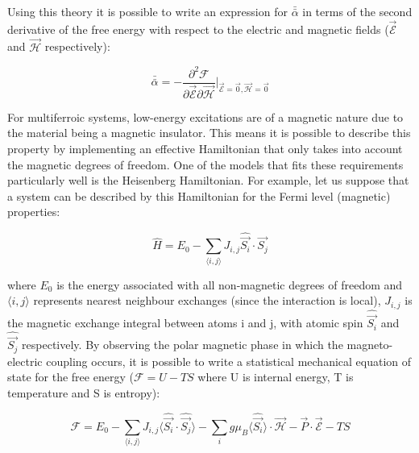 \documentclass[10pt]{article}
\begin{document}
Using this theory it is possible to write an expression for $\bar{\bar{\alpha}}$ in terms of the second derivative of the free energy with respect to the electric and magnetic fields ($\vec{\mathcal{E}}$ and $\vec{\mathcal{H}}$ respectively):

\begin{equation*}
\bar{\bar{\alpha}} = -\frac{\partial^2 \mathcal{F}}{\partial \vec{\mathcal{E}}\partial\vec{\mathcal{H}}}\biggr\vert_{\vec{\mathcal{E}}=\vec{0}, \vec{\mathcal{H}} = \vec{0}}
\end{equation*}

For multiferroic systems, low-energy excitations are of a magnetic nature due to the material being a magnetic insulator. This means it is possible to describe this property by implementing an effective Hamiltonian that only takes into account the magnetic degrees of freedom. One of the models that fits these requirements particularly well is the Heisenberg Hamiltonian. For example, let us suppose that a system can be described by this Hamiltonian for the Fermi level (magnetic) properties:

\begin{equation}
\hat{H} = E_0 - \sum_{\langle i,j \rangle} J_{i,j}\hat{\vec{S_i}}\cdot \hat{\vec{S_j}}
\end{equation}

where $E_0$ is the energy associated with all non-magnetic degrees of freedom and $\langle i,j \rangle$ represents nearest neighbour exchanges (since the interaction is local), $J_{i,j}$ is the magnetic exchange integral between atoms i and j, with atomic spin $\hat{\vec{S_i}}$ and $\hat{\vec{S_j}}$ respectively. By observing the polar magnetic phase in which the magneto-electric coupling occurs, it is possible to write a statistical mechanical equation of state for the free energy ($\mathcal{F} = U - TS$ where U is internal energy, T is temperature and S is entropy):

\begin{equation*}
\mathcal{F} = E_0 - \sum_{\langle i,j \rangle} J_{i,j}\langle \hat{\vec{S_i}}\cdot \hat{\vec{S_j}} \rangle - \sum_{i}g\mu_{B}\langle \hat{\vec{S_i}}\rangle \cdot \mathcal{\vec{H}} - \vec{P}\cdot \mathcal{\vec{E}} - TS
\end{equation*}
\end{document}
